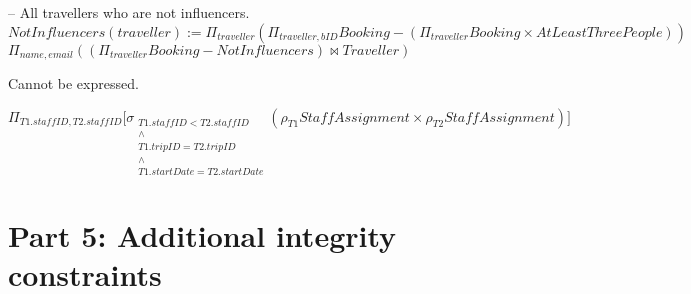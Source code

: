 \documentclass{article}
\newcommand{\var}[1]{\mathit{#1}}
\begin{document}
\begin{enumerate}
{    -- All travellers who are not influencers. \\[5pt]
    $NotInfluencers(traveller) := \Pi_{traveller} (\Pi_{traveller, bID} Booking - (\Pi_{traveller} Booking \times AtLeastThreePeople))$ \\[10pt]
    $\Pi_{name, email} ((\Pi_{traveller} Booking - NotInfluencers) \bowtie Traveller)$
    \item Cannot be expressed.
    \item $\Pi_{\var{T1.staffID}, \var{T2.staffID}} \Big[ \sigma_{\substack{T1.staffID < T2.staffID \\ \wedge \\ T1.tripID = T2.tripID \\ \wedge \\ T1.startDate = T2.startDate}} (\rho_{T1} StaffAssignment \times \rho_{T2} StaffAssignment) \Big]$
}\end{enumerate}

\newpage

\section*{Part 5: Additional integrity constraints}
\end{document}

